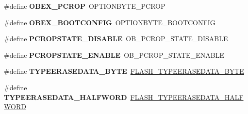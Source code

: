 \begin{DoxyCompactItemize}
\item 
\hypertarget{group___h_a_l___f_l_a_s_h___aliased___defines_ga1de788f8cf04b70320aaebf3388e638c}{\#define {\bfseries O\-B\-E\-X\-\_\-\-P\-C\-R\-O\-P}~O\-P\-T\-I\-O\-N\-B\-Y\-T\-E\-\_\-\-P\-C\-R\-O\-P}\label{group___h_a_l___f_l_a_s_h___aliased___defines_ga1de788f8cf04b70320aaebf3388e638c}

\item 
\hypertarget{group___h_a_l___f_l_a_s_h___aliased___defines_ga79284d41c929869394172fc526ff3d7e}{\#define {\bfseries O\-B\-E\-X\-\_\-\-B\-O\-O\-T\-C\-O\-N\-F\-I\-G}~O\-P\-T\-I\-O\-N\-B\-Y\-T\-E\-\_\-\-B\-O\-O\-T\-C\-O\-N\-F\-I\-G}\label{group___h_a_l___f_l_a_s_h___aliased___defines_ga79284d41c929869394172fc526ff3d7e}

\item 
\hypertarget{group___h_a_l___f_l_a_s_h___aliased___defines_ga09f7800119c1971e339df62f11beab14}{\#define {\bfseries P\-C\-R\-O\-P\-S\-T\-A\-T\-E\-\_\-\-D\-I\-S\-A\-B\-L\-E}~O\-B\-\_\-\-P\-C\-R\-O\-P\-\_\-\-S\-T\-A\-T\-E\-\_\-\-D\-I\-S\-A\-B\-L\-E}\label{group___h_a_l___f_l_a_s_h___aliased___defines_ga09f7800119c1971e339df62f11beab14}

\item 
\hypertarget{group___h_a_l___f_l_a_s_h___aliased___defines_ga9e086afe58f178c3e86526666bedc217}{\#define {\bfseries P\-C\-R\-O\-P\-S\-T\-A\-T\-E\-\_\-\-E\-N\-A\-B\-L\-E}~O\-B\-\_\-\-P\-C\-R\-O\-P\-\_\-\-S\-T\-A\-T\-E\-\_\-\-E\-N\-A\-B\-L\-E}\label{group___h_a_l___f_l_a_s_h___aliased___defines_ga9e086afe58f178c3e86526666bedc217}

\item 
\hypertarget{group___h_a_l___f_l_a_s_h___aliased___defines_ga4b3d9b5629b76e57da896b4b7f95d3d7}{\#define {\bfseries T\-Y\-P\-E\-E\-R\-A\-S\-E\-D\-A\-T\-A\-\_\-\-B\-Y\-T\-E}~\hyperlink{group___f_l_a_s_h_ex___type___erase___data_ga337f4bfeaea12349f1350b6b25a9c135}{F\-L\-A\-S\-H\-\_\-\-T\-Y\-P\-E\-E\-R\-A\-S\-E\-D\-A\-T\-A\-\_\-\-B\-Y\-T\-E}}\label{group___h_a_l___f_l_a_s_h___aliased___defines_ga4b3d9b5629b76e57da896b4b7f95d3d7}

\item 
\hypertarget{group___h_a_l___f_l_a_s_h___aliased___defines_gaaad85877529e61a7d77a294a9cf2d474}{\#define {\bfseries T\-Y\-P\-E\-E\-R\-A\-S\-E\-D\-A\-T\-A\-\_\-\-H\-A\-L\-F\-W\-O\-R\-D}~\hyperlink{group___f_l_a_s_h_ex___type___erase___data_gafbb0b0f471a5dd56eca9cf1c516d7ed1}{F\-L\-A\-S\-H\-\_\-\-T\-Y\-P\-E\-E\-R\-A\-S\-E\-D\-A\-T\-A\-\_\-\-H\-A\-L\-F\-W\-O\-R\-D}}\label{group___h_a_l___f_l_a_s_h___aliased___defines_gaaad85877529e61a7d77a294a9cf2d474}


\end{DoxyCompactItemize}
